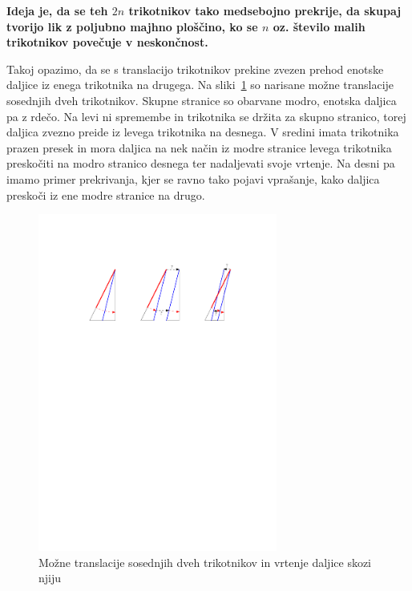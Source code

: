 \documentclass[a4paper, 12pt]{article}
\begin{document}
\textbf{Ideja je, da se teh $ 2n $ trikotnikov tako medsebojno prekrije, da skupaj tvorijo lik z poljubno majhno ploščino, ko se $ n $ oz. število malih trikotnikov povečuje v neskončnost.}

Takoj opazimo, da se s translacijo trikotnikov prekine zvezen prehod enotske daljice iz enega trikotnika na drugega. Na sliki~\ref{preskok1} so narisane možne translacije sosednjih dveh trikotnikov. Skupne stranice so obarvane modro, enotska daljica pa z rdečo. Na levi ni spremembe in trikotnika se držita za skupno stranico, torej daljica zvezno preide iz levega trikotnika na desnega. V sredini imata trikotnika prazen presek in mora daljica na nek način iz modre stranice levega trikotnika preskočiti na modro stranico desnega ter nadaljevati svoje vrtenje. Na desni pa imamo primer prekrivanja, kjer se ravno tako pojavi vprašanje, kako daljica preskoči iz ene modre stranice na drugo.

\begin{figure}[h!]
    \centering
    \includegraphics[width=0.7\textwidth]{ipe_slike/preskok1.pdf}
    \caption{Možne translacije sosednjih dveh trikotnikov in vrtenje daljice skozi njiju}
    \label{preskok1}
\end{figure}

\end{document}
